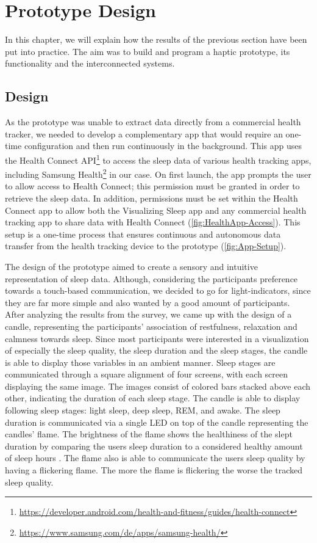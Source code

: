 \documentclass[
  a4paper,  %
  twoside,  %
  bibliography=totoc,
  headsepline,
  cleardoublepage=empty,
  parskip=half,
  draft=false
]{scrbook}
\begin{document}
\chapter{Prototype Design}
In this chapter, we will explain how the results of the previous section have been put into practice. The aim
was to build and program a haptic prototype, its functionality and the interconnected systems.
\section{Design}
As the prototype was unable to extract data directly from a commercial health tracker, we needed to develop a complementary app that would require an one-time configuration and then run continuously in the background. This app uses the Health Connect API\footnote{\url{https://developer.android.com/health-and-fitness/guides/health-connect}} to access the sleep data of various health tracking apps, including Samsung Health\footnote{\url{https://www.samsung.com/de/apps/samsung-health/}} in our case. On first launch, the app prompts the user to allow access to Health Connect; this permission must be granted in order to retrieve the sleep data. In addition, permissions must be set within the Health Connect app to allow both the Visualizing Sleep app and any commercial health tracking app to share data with Health Connect (\autoref{fig:HealthApp-Access}). This setup is a one-time process that ensures continuous and autonomous data transfer from the health tracking device to the prototype (\autoref{fig:App-Setup}).

The design of the prototype aimed to create a sensory and intuitive representation of sleep data. Although, considering the participants preference towards a touch-based communication, we decided to go for light-indicators, since they are far more simple and also wanted by a good amount of participants. After analyzing the results from the survey, we came up with the design of a candle, representing the participants' association of restfulness, relaxation and calmness towards sleep. Since most participants were interested in a visualization of especially the sleep quality, the sleep duration and the sleep stages, the candle is able to display those variables in an ambient manner. Sleep stages are communicated through a square alignment of four screens, with each screen displaying the same image. The images consist of colored bars stacked above each other, indicating the duration of each sleep stage. The candle is able to display following sleep stages: light sleep, deep sleep, REM, and awake. The sleep duration is communicated via a single LED on top of the candle representing the candles' flame. The brightness of the flame shows the healthiness of the slept duration by comparing the users sleep duration to a considered healthy amount of sleep hours \cite{chaput_sleeping_2018}. The flame also is able to communicate the users sleep quality by having a flickering flame. The more the flame is flickering the worse the tracked sleep quality. 
\end{document}
